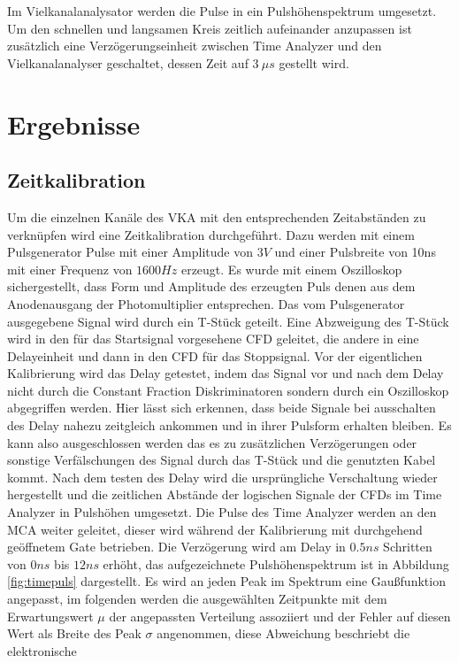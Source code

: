 \documentclass[a4paper,12pt]{article}
\begin{document}
Im Vielkanalanalysator werden die Pulse in ein Pulshöhenspektrum umgesetzt.
Um den schnellen und langsamen Kreis zeitlich aufeinander 
anzupassen ist zusätzlich eine Verzögerungseinheit zwischen Time Analyzer und den Vielkanalanalyser geschaltet, dessen Zeit auf $\SI{3}{μs}$ gestellt wird.

\section{Ergebnisse}
\subsection{Zeitkalibration}
Um die einzelnen Kanäle des VKA mit den entsprechenden Zeitabständen zu verknüpfen wird eine Zeitkalibration durchgeführt. Dazu werden
mit einem Pulsgenerator Pulse mit einer Amplitude von $3\si{V}$ und einer Pulsbreite von 10ns mit einer Frequenz von $1600\si{Hz}$ erzeugt.
Es wurde mit einem Oszilloskop sichergestellt, dass Form und Amplitude des erzeugten Puls denen aus dem Anodenausgang der Photomultiplier 
entsprechen. Das vom Pulsgenerator ausgegebene Signal wird durch ein T-Stück geteilt. Eine Abzweigung des T-Stück wird in den für das Startsignal vorgesehene 
CFD geleitet, die andere in eine Delayeinheit und dann in den CFD für das Stoppsignal. Vor der eigentlichen Kalibrierung wird das Delay getestet, indem
das Signal vor und nach dem Delay nicht durch die Constant Fraction Diskriminatoren sondern durch ein Oszilloskop abgegriffen werden. Hier lässt sich erkennen,
dass beide Signale bei ausschalten des Delay nahezu zeitgleich ankommen und in ihrer Pulsform erhalten bleiben. Es kann also ausgeschlossen werden das es zu 
zusätzlichen Verzögerungen oder sonstige Verfälschungen des Signal durch das T-Stück und die genutzten Kabel kommt.
Nach dem testen des Delay wird die ursprüngliche Verschaltung wieder hergestellt und die zeitlichen Abstände der logischen Signale der CFDs im Time Analyzer
in Pulshöhen umgesetzt. Die Pulse des Time Analyzer werden an den MCA weiter geleitet, dieser wird während der Kalibrierung mit
durchgehend geöffnetem Gate betrieben. Die Verzögerung wird am Delay in $0.5\si{ns}$ Schritten von $0\si{ns}$ bis $12\si{ns}$ erhöht, das aufgezeichnete Pulshöhenspektrum 
ist in Abbildung \ref{fig:timepuls} dargestellt. Es wird an jeden Peak im Spektrum eine Gaußfunktion angepasst, im folgenden werden die ausgewählten Zeitpunkte mit
dem Erwartungswert $\mu$ der angepassten Verteilung assoziiert und der Fehler auf diesen Wert als Breite des Peak $\sigma$ angenommen, diese Abweichung beschriebt die elektronische 
\end{document}

